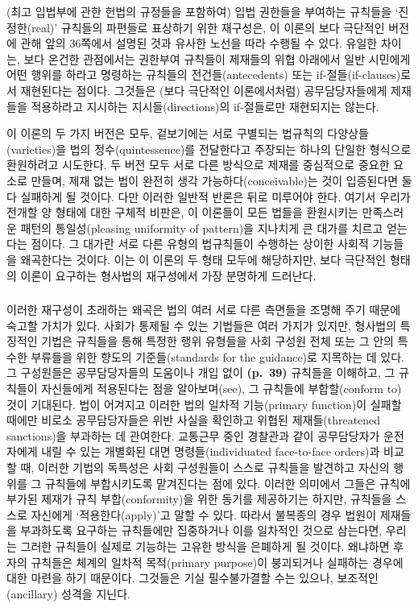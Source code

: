 (최고 입법부에 관한 헌법의 규정들을 포함하여) 입법 권한들을 부여하는
규칙들을 ‘진정한(real)’ 규칙들의 파편들로 표상하기 위한 재구성은, 이
이론의 보다 극단적인 버전에 관해 앞의 36쪽에서 설명된 것과 유사한 노선을
따라 수행될 수 있다. 유일한 차이는, 보다 온건한 관점에서는 권한부여
규칙들이 제재들의 위협 아래에서 일반 시민에게 어떤 행위를 하라고
명령하는 규칙들의 전건들(antecedents) 또는 if-절들(if-clauses)로서
재현된다는 점이다. 그것들은 (보다 극단적인 이론에서처럼)
공무담당자들에게 제재들을 적용하라고 지시하는 지시들(directions)의
if-절들로만 재현되지는 않는다.

이 이론의 두 가지 버전은 모두, 겉보기에는 서로 구별되는 법규칙의
다양상들(varieties)을 법의 정수(quintessence)를 전달한다고 주장되는
하나의 단일한 형식으로 환원하려고 시도한다. 두 버전 모두 서로 다른
방식으로 제재를 중심적으로 중요한 요소로 만들며, 제재 없는 법이 완전히
생각 가능하다(conceivable)는 것이 입증된다면 둘 다 실패하게 될 것이다.
다만 이러한 일반적 반론은 뒤로 미루어야 한다. 여기서 우리가 전개할 양
형태에 대한 구체적 비판은, 이 이론들이 모든 법들을 환원시키는 만족스러운
패턴의 통일성(pleasing uniformity of pattern)을 지나치게 큰 대가를
치르고 얻는다는 점이다. 그 대가란 서로 다른 유형의 법규칙들이 수행하는
상이한 사회적 기능들을 왜곡한다는 것이다. 이는 이 이론의 두 형태 모두에
해당하지만, 보다 극단적인 형태의 이론이 요구하는 형사법의 재구성에서
가장 분명하게 드러난다.

\subsubsection{\texorpdfstring{}{통일성의 대가로서의 왜곡}}\label{uxd1b5uxc77cuxc131uxc758-uxb300uxac00uxb85cuxc11cuxc758-uxc65cuxace1}

이러한 재구성이 초래하는 왜곡은 법의 여러 서로 다른 측면들을 조명해 주기
때문에 숙고할 가치가 있다. 사회가 통제될 수 있는 기법들은 여러 가지가
있지만, 형사법의 특징적인 기법은 규칙들을 통해 특정한 행위 유형들을 사회
구성원 전체 또는 그 안의 특수한 부류들을 위한 향도의 기준들(standards
for the guidance)로 지목하는 데 있다. 그 구성원들은 공무담당자들의
도움이나 개입 없이 \textbf{(p.~39)} 규칙들을 이해하고, 그 규칙들이
자신들에게 적용된다는 점을 알아보며(see), 그 규칙들에 부합할(conform to)
것이 기대된다. 법이 어겨지고 이러한 법의 일차적 기능(primary function)이
실패할 때에만 비로소 공무담당자들은 위반 사실을 확인하고 위협된
제재들(threatened sanctions)을 부과하는 데 관여한다. 교통근무 중인
경찰관과 같이 공무담당자가 운전자에게 내릴 수 있는 개별화된 대면
명령들(individuated face-to-face orders)과 비교할 때, 이러한 기법의
독특성은 사회 구성원들이 스스로 규칙들을 발견하고 자신의 행위를 그
규칙들에 부합시키도록 맡겨진다는 점에 있다. 이러한 의미에서 그들은
규칙에 부가된 제재가 규칙 부합(conformity)을 위한 동기를 제공하기는
하지만, 규칙들을 스스로 자신에게 ‘적용한다(apply)’고 말할 수 있다.
따라서 불복종의 경우 법원이 제재들을 부과하도록 요구하는 규칙들에만
집중하거나 이를 일차적인 것으로 삼는다면, 우리는 그러한 규칙들이 실제로
기능하는 고유한 방식을 은폐하게 될 것이다. 왜냐하면 후자의 규칙들은
체계의 일차적 목적(primary purpose)이 붕괴되거나 실패하는 경우에 대한
마련을 하기 때문이다. 그것들은 기실 필수불가결할 수는 있으나,
보조적인(ancillary) 성격을 지닌다.

